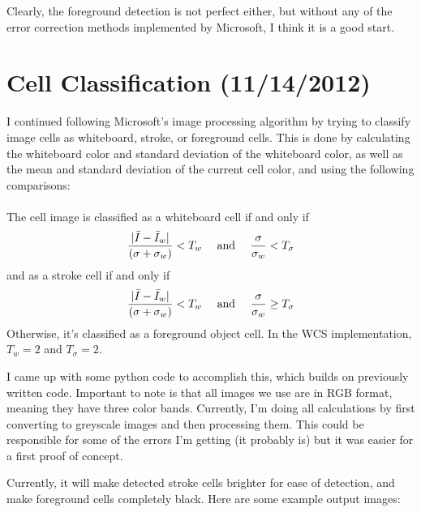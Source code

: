 \documentclass[]{article}
\newcommand{\comment}[1]{}  							%
\begin{document}
		Clearly, the foreground detection is not perfect either, but without any of the error correction methods implemented by Microsoft, I think it is a good start.
	\section{Cell Classification (11/14/2012)}
		I continued following Microsoft's image processing algorithm by trying to classify image cells as whiteboard, stroke, or foreground cells.  This is done by calculating the whiteboard color and standard deviation of the whiteboard color, as well as the mean and standard deviation of the current cell color, and using the following comparisons: \\ \\
	 The cell image is classified as a whiteboard cell if and only if \[ {|\bar{I} - \bar{I}_w| \over (\sigma + \sigma_w)}<T_w \quad \textrm{ and } \quad  {\sigma \over \sigma_w }< T_\sigma \] 
and as a stroke cell if and only if
\[{|\bar{I}-\bar{I}_w| \over (\sigma + \sigma_w)}<T_w \quad \textrm{ and } \quad {\sigma \over \sigma_w} \geq T_\sigma \] 
Otherwise, it's classified as a foreground object cell.  In the WCS implementation, $T_w=2$ and $T_\sigma=2$.	

I came up with some python code to accomplish this, which builds on previously written code.  Important to note is that all images we use are in RGB format, meaning they have three color bands.  Currently, I'm doing all calculations by first converting to greyscale images and then processing them.  This could be responsible for some of the errors I'm getting (it probably is) but it was easier for a first proof of concept.  
\comment{
\begin{verbatim}

Tw = 2
Tsig = 2
bwim = im.convert("L")
sigw = 8
for  i in nsize:
        for j in nsize:
           
            cell_bwimage[i][j] = bwim.crop(cell[i][j])
            Iw[i][j] = white[i][j]            
            I[i][j] = ImageStat.Stat(cell_bwimage[i][j]).mean
            sig[i][j] = ImageStat.Stat(cell_bwimage[i][j]).stddev
          
            if abs(I[i][j][0]-Iw[i][j])/(sig[i][j][0]+sigw) < Tw and sig[i][j][0]/sigw < Tsig:
               cell_id[i][j] = "whiteboard cell"

            elif abs(I[i][j][0]-Iw[i][j])/(sig[i][j][0]+sigw) < Tw and sig[i][j][0]/sigw >= Tsig:
               cell_id[i][j] = "stroke cell"
               temp = ImageEnhance.Brightness(cell_image[i][j])
               temp = temp.enhance(2.0)
               im.paste(temp, cell[i][j])

            else:
               cell_id[i][j] = "foreground object"
               temp = ImageEnhance.Brightness(cell_image[i][j])
               temp = temp.enhance(0)
               im.paste(temp, cell[i][j])
\end{verbatim}
}
Currently, it will make detected stroke cells brighter for ease of detection, and make foreground cells completely black.  Here are some example output images:
\end{document}
